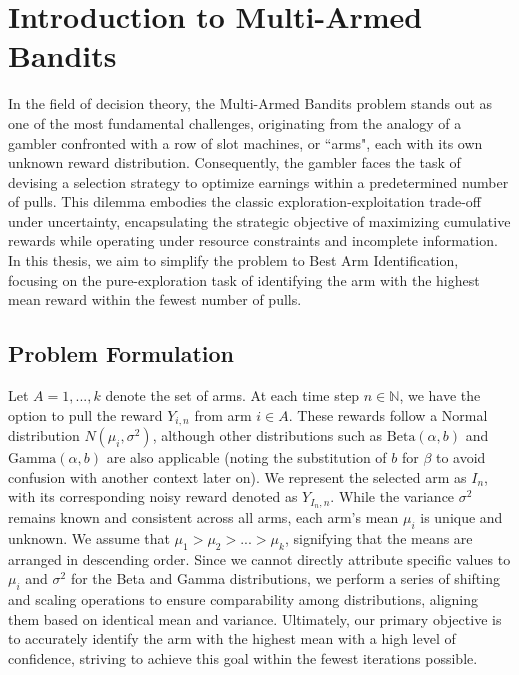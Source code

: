 \documentclass[a4paper, 12pt]{article}
\theoremstyle{definition}
\begin{document}
\newpage
\tableofcontents
\listoftables
\listoffigures



\newpage
\section{Introduction to Multi-Armed Bandits} \label{sec:intro}
In the field of decision theory, the Multi-Armed Bandits problem stands out as one of the most fundamental challenges, originating from the analogy of a gambler confronted with a row of slot machines, or ``arms", each with its own unknown reward distribution. Consequently, the gambler faces the task of devising a selection strategy to optimize earnings within a predetermined number of pulls. This dilemma embodies the classic exploration-exploitation trade-off under uncertainty, encapsulating the strategic objective of maximizing cumulative rewards while operating under resource constraints and incomplete information. In this thesis, we aim to simplify the problem to Best Arm Identification, focusing on the pure-exploration task of identifying the arm with the highest mean reward within the fewest number of pulls.


\subsection{Problem Formulation}
Let $A = {1, ..., k}$ denote the set of arms. At each time step $n \in \mathbb{N}$, we have the option to pull the reward $Y_{i,n}$ from arm $i \in A$. These rewards follow a Normal distribution $N(\mu_i,\sigma^2)$, although other distributions such as $\mathrm{Beta}(\alpha, b)$ and $\mathrm{Gamma}(\alpha, b)$ are also applicable (noting the substitution of $b$ for $\beta$ to avoid confusion with another context later on). We represent the selected arm as $I_n$, with its corresponding noisy reward denoted as $Y_{I_n,n}$. While the variance $\sigma^2$ remains known and consistent across all arms, each arm's mean $\mu_i$ is unique and unknown. We assume that $\mu_1 > \mu_2 > ... > \mu_k$, signifying that the means are arranged in descending order. Since we cannot directly attribute specific values to $\mu_i$ and $\sigma^2$ for the Beta and Gamma distributions, we perform a series of shifting and scaling operations to ensure comparability among distributions, aligning them based on identical mean and variance. Ultimately, our primary objective is to accurately identify the arm with the highest mean with a high level of confidence, striving to achieve this goal within the fewest iterations possible.
\end{document}
